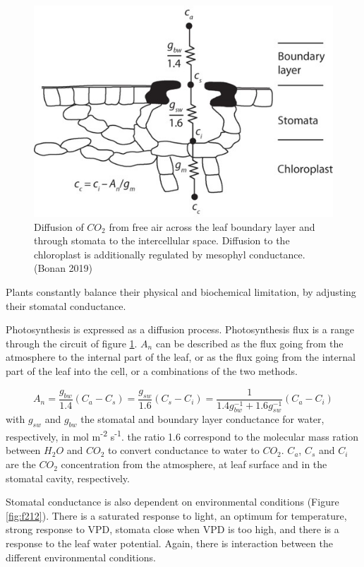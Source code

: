 \documentclass[12pt,oneside]{book}
\begin{document}
\begin{figure}

{\centering \includegraphics[width=0.8\linewidth]{figures/chap2/conductance} 

}

\caption{Diffusion of $CO_2$ from free air across the leaf boundary layer and through stomata to the intercellular space. Diffusion to the chloroplast is additionally regulated by mesophyl conductance. (Bonan 2019)}\label{fig:f211}
\end{figure}

Plants constantly balance their physical and biochemical limitation, by
adjusting their stomatal conductance.

Photosynthesis is expressed as a diffusion process. Photosynthesis flux
is a range through the circuit of figure \ref{fig:f211}. \(A_n\) can be
described as the flux going from the atmosphere to the internal part of
the leaf, or as the flux going from the internal part of the leaf into
the cell, or a combinations of the two methods.

\[
A_n=\frac{g_{bw}}{1.4}(C_a-C_s) = \frac{g_{sw}}{1.6}(C_s-C_i)=\frac{1}{1.4g_{bw}^{-1}+1.6g_{sw}^{-1}}(C_a-C_i)
\] with \(g_{sw}\) and \(g_{bw}\) the stomatal and boundary layer
conductance for water, respectively, in mol m\textsuperscript{-2}
s\textsuperscript{-1}. the ratio 1.6 correspond to the molecular mass
ration between \(H_2O\) and \(CO_2\) to convert conductance to water to
\(CO_2\). \(C_a\), \(C_s\) and \(C_i\) are the \(CO_2\) concentration
from the atmosphere, at leaf surface and in the stomatal cavity,
respectively.

Stomatal conductance is also dependent on environmental conditions
(Figure \ref{fig:f212}). There is a saturated response to light, an
optimum for temperature, strong response to VPD, stomata close when VPD
is too high, and there is a response to the leaf water potential. Again,
there is interaction between the different environmental conditions.
\end{document}
